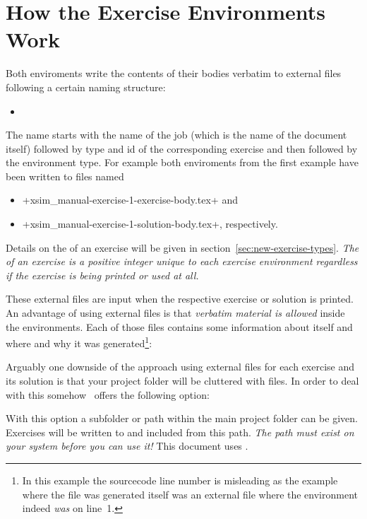 \documentclass[load-preamble+]{cnltx-doc}
\begin{document}
\section{How the Exercise Environments Work}
Both enviroments write the contents of their bodies verbatim to external files
following a certain naming structure:
\begin{itemize}
  \item
\end{itemize}
The name starts with the name of the job (which is the name of the document
itself) followed by type and id of the corresponding exercise and then
followed by the environment type.  For example both enviroments from the first
example have been written to files named
\begin{itemize}
  \item \verbcode+xsim_manual-exercise-1-exercise-body.tex+ and
  \item \verbcode+xsim_manual-exercise-1-solution-body.tex+, respectively.
\end{itemize}
Details on the  of an exercise will be given in
section~\vref{sec:new-exercise-types}.  \emph{The  of an exercise is
  a positive integer unique to each exercise environment regardless if the
  exercise is being printed or used at all.}

These external files are input when the respective exercise or solution is
printed.  An advantage of using external files is that \emph{verbatim material
  is allowed} inside the environments.  Each of those files contains some
information about itself and where and why it was generated\footnote{In this
  example the sourcecode line number is misleading as the example where the
  file was generated itself was an external file where the 
  environment indeed \emph{was} on line~1.}:


Arguably one downside of the approach using external files for each exercise
and its solution is that your project folder will be cluttered with files.  In
order to deal with this somehow \xsim\ offers the following option:
\begin{options}
  \Default
    With this option a subfolder or path within the main project folder can be
    given.  Exercises will be written to and included from this path.
    \emph{The path must exist on your system before you can use it!} This
    document uses .
\end{options}
\end{document}

